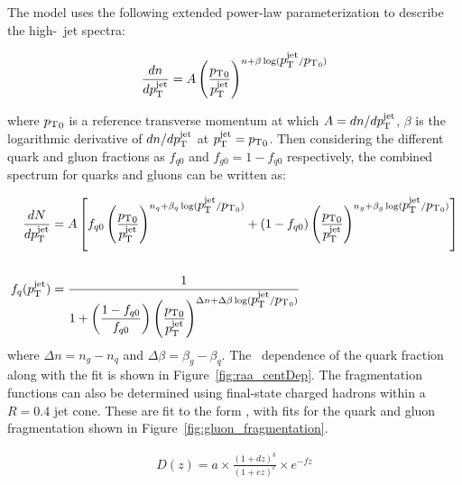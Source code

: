 The model uses the following extended power-law parameterization to describe the high-\pt\ jet spectra:

\begin{align}
\frac{dn}{d\mbox{$p_{\mathrm{T}}^{\mathrm{jet}}$}} = A \left( \frac{\mbox{$p_{\mathrm{T}}$}_0}{\mbox{$p_{\mathrm{T}}^{\mathrm{jet}}$}} \right) ^{n+\beta \log(\mbox{$p_{\mathrm{T}}^{\mathrm{jet}}$} / \mbox{$p_{\mathrm{T}}$}_0)}
\end{align}

where $\mbox{$p_{\mathrm{T}}$}_0$ is a reference transverse momentum at which $A= dn/d\mbox{$p_{\mathrm{T}}^{\mathrm{jet}}$}$, $\beta$ is the logarithmic derivative of $dn/d\mbox{$p_{\mathrm{T}}^{\mathrm{jet}}$}$ at $\mbox{$p_{\mathrm{T}}^{\mathrm{jet}}$} = \mbox{$p_{\mathrm{T}}$}_0$. Then considering the different quark and gluon fractions as $f_{q0}$ and $f_{g0} = 1-f_{q0}$ respectively, the combined spectrum for quarks and gluons can be written as:

\begin{align}
 \frac{dN}{d\mbox{$p_{\mathrm{T}}^{\mathrm{jet}}$}} &= A \left[ f_{q0} \left( \frac{\mbox{$p_{\mathrm{T}}$}_0}{\mbox{$p_{\mathrm{T}}^{\mathrm{jet}}$}} \right)^{n_q+ \beta_q \log(\mbox{$p_{\mathrm{T}}^{\mathrm{jet}}$} / \mbox{$p_{\mathrm{T}}$}_0)} + (1-f_{q0}) \left( \frac{\mbox{$p_{\mathrm{T}}$}_0}{\mbox{$p_{\mathrm{T}}^{\mathrm{jet}}$}} \right)^{n_g + \beta_g \log(\mbox{$p_{\mathrm{T}}^{\mathrm{jet}}$} / \mbox{$p_{\mathrm{T}}$}_0)} \right] \\
\nonumber \\ 
\label{eq:eq_q_frac} f_q (\mbox{$p_{\mathrm{T}}^{\mathrm{jet}}$}) &= \dfrac{1}{1 + \left(\dfrac{1-f_{q0}}{f_{q0}}\right) \left( \dfrac{\mbox{$p_{\mathrm{T}}$}_0}{\mbox{$p_{\mathrm{T}}^{\mathrm{jet}}$}}\right)^{\Delta n + \Delta \beta \log(\mbox{$p_{\mathrm{T}}^{\mathrm{jet}}$}/\mbox{$p_{\mathrm{T}}$}_0)} }
\end{align}
where $\Delta n = n_g - n_q$ and $\Delta \beta = \beta_g - \beta_q$. The \pt\ dependence of the quark fraction along with the fit is shown in Figure~\ref{fig:raa_centDep}. The fragmentation functions can also be determined using final-state charged hadrons within a $R=0.4$ jet cone. These are fit to the form \Dz, with fits for the quark and gluon fragmentation shown in Figure~\ref{fig:gluon_fragmentation}.


\begin{align}
D(z) = a \times \frac{(1+dz)^b}{(1+ez)^c} \times e^{-fz}
\label{eq:ff_param}
\end{align}


